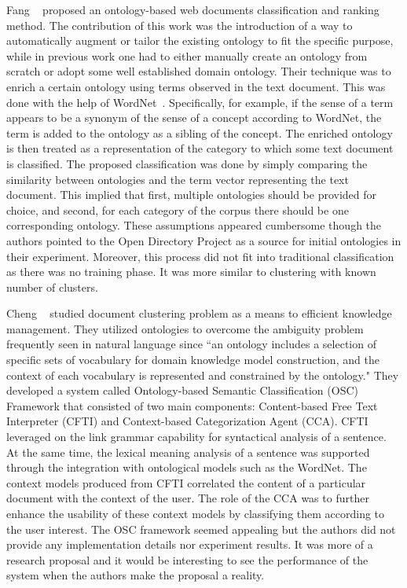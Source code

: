 Fang \etal~\cite{Fang2007Ont} proposed an ontology-based web documents classification and ranking method. The contribution of this work was the introduction of a way to automatically augment or tailor the existing ontology to fit the specific purpose, while in previous work one had to either manually create an ontology from scratch or adopt some well established domain ontology. Their technique was to enrich a certain ontology using terms observed in the text document. This was done with the help of WordNet~\cite{Miller1995WordNet}. Specifically, for example, if the sense of a term appears to be a synonym of the sense of a concept according to WordNet, the term is added to the ontology as a sibling of the concept. The enriched ontology is then treated as a representation of the category to which some text document is classified. The proposed classification was done by simply comparing the similarity between ontologies and the term vector representing the text document. This implied that first, multiple ontologies should be provided for choice, and second, for each category of the corpus there should be one corresponding ontology. These assumptions appeared cumbersome though the authors pointed to the Open Directory Project as a source for initial ontologies in their experiment. Moreover, this process did not fit into traditional classification as there was no training phase. It was more similar to clustering with known number of clusters.

Cheng \etal~\cite{ChengPK03} studied document clustering problem as a means to efficient knowledge management. They utilized ontologies to overcome the ambiguity problem frequently seen in natural language since ``an ontology includes a selection of specific sets of vocabulary for domain knowledge model construction, and the context of each vocabulary is represented and constrained by the ontology." They developed a system called Ontology-based Semantic Classification (OSC) Framework that consisted of two main components: Content-based Free Text Interpreter (CFTI) and Context-based Categorization Agent (CCA). CFTI leveraged on the link grammar capability for syntactical analysis of a sentence. At the same time, the lexical meaning analysis of a sentence was supported through the integration with ontological models such as the WordNet. The context models produced from CFTI correlated the content of a particular document with the context of the user. The role of the CCA was to further enhance the usability of these context models by classifying them according to the user interest. The OSC framework seemed appealing but the authors did not provide any implementation details nor experiment results. It was more of a research proposal and it would be interesting to see the performance of the system when the authors make the proposal a reality.

